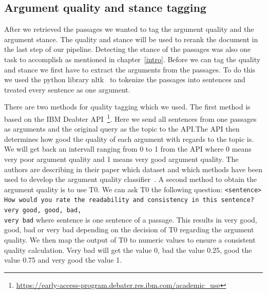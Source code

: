     \subsection{Argument quality and stance tagging}
        After we retrieved the passages we wanted to tag the argument quality and the argument stance. The quality and stance  will be used to rerank the document in the last step of our pipeline. Detecting the stance of the passages was also one task to accomplish as mentioned in chapter~\ref{intro}. Before we can tag the quality and stance we first have to extract the arguments from the passages. To do this we used the python library nltk~\cite{BirdLK2009} to tokenize the passages into sentences and treated every sentence as one argument.\par
        There are two methods for quality tagging which we used. The first method is based on the IBM Deabter API~\footnote{\url{https://early-access-program.debater.res.ibm.com/academic_use}}. Here we send all sentences from one passages as arguments and the original query as the topic to the API.The API then determines how good the quality of each argument with regards to the topic is. We will get back an intervall ranging from 0 to 1 from the API where 0 means very poor argument quality and 1 means very good argument quality. The authors \citeauthor{ToledoG2019} are describing in their paper which dataset and which methods have been used to develop the argument quality classifier~\cite{ToledoG2019}. A second method to obtain the argument quality is to use T0. We can ask T0 the following question: \texttt{<sentence> How would you rate the readability and
        consistency in this sentence? very good, good, bad,\\ very bad} where sentence is one sentence of a passage. This results in very good, good, bad or very bad depending on the decision of T0 regarding the argument quality. We then map the output of T0 to numeric values to ensure a consistent quality calculation. Very bad will get the value 0, bad the value 0.25, good the value 0.75 and very good the value 1.\par
